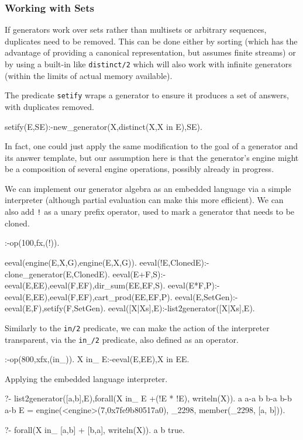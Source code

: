 \documentclass{new_tlp}
\begin{document}
\subsubsection{Working with Sets}

If generators work over sets rather than multisets or arbitrary sequences,
duplicates need to be removed. This can be done either by sorting (which has the advantage
of providing a canonical representation, but assumes finite streams) or by using  a built-in like {\tt distinct/2} which will also work with infinite generators (within the limits of actual memory available).

The predicate {\tt setify} wraps a generator to ensure it produces a set of answers, with duplicates removed.
\begin{code}
setify(E,SE):-new_generator(X,distinct(X,X in E),SE).
\end{code}
In fact, one could just apply the same modification to the goal of a generator and its answer template, but our assumption here is that the generator's engine might be a composition of several engine operations, possibly already in progress.

We can implement our generator algebra as an embedded language via a simple interpreter
(although partial evaluation can make this more efficient). We can also add {\tt !} as a unary prefix operator, used to mark a generator that needs to be cloned.

\begin{code}
:-op(100,fx,(!)).

eeval(engine(E,X,G),engine(E,X,G)).
eeval(!E,ClonedE):-clone_generator(E,ClonedE).
eeval(E+F,S):-eeval(E,EE),eeval(F,EF),dir_sum(EE,EF,S).
eeval(E*F,P):-eeval(E,EE),eeval(F,EF),cart_prod(EE,EF,P).
eeval({E},SetGen):-eeval(E,F),setify(F,SetGen).
eeval([X|Xs],E):-list2generator([X|Xs],E).
\end{code}
Similarly to the {\tt in/2} predicate, we can make the action of the
interpreter transparent, via the {\tt in\_/2} predicate, also defined as an operator.
\begin{code}
:-op(800,xfx,(in_)).
X in_ E:-eeval(E,EE),X in EE.     
\end{code}


\BX
Applying the embedded language interpreter.
\begin{codex}
?- list2generator([a,b],E),forall(X in_ E +(!E * !E), writeln(X)).
a
a-a
b
b-a
b-b
a-b
E = engine(<engine>(7,0x7fe9b80517a0), _2298, member(_2298, [a, b])).

?- forall(X in_ {[a,b] + [b,a]}, writeln(X)).
a
b
true.
\end{codex}
\end{document}

